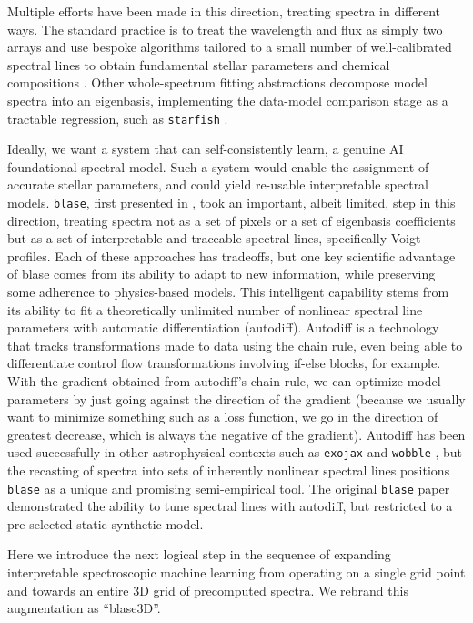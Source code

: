 \documentclass[twocolumn, linenumbers]{aastex631}
\begin{document}
Multiple efforts have been made in this direction, treating spectra in different ways. 
The standard practice is to treat the wavelength and flux as simply two arrays and use bespoke algorithms tailored to a small number of well-calibrated spectral lines to obtain fundamental stellar parameters and chemical compositions \citep{pipeline1, pipeline2}. 
Other whole-spectrum fitting abstractions decompose model spectra into an eigenbasis, implementing the data-model comparison stage as a tractable regression, such as \texttt{starfish} \citep{starfish}. 

Ideally, we want a system that can self-consistently learn, a genuine AI foundational spectral model. 
Such a system would enable the assignment of accurate stellar parameters, and could yield re-usable interpretable spectral models.
\texttt{blase}, first presented in \citealt{blase}, took an important, albeit limited, step in this direction, treating spectra not as a set of pixels or a set of eigenbasis coefficients but as a set of interpretable and traceable spectral lines, specifically Voigt profiles.
Each of these approaches has tradeoffs, but one key scientific advantage of blase comes from its ability to adapt to new information, while preserving some adherence to physics-based models. 
This intelligent capability stems from its ability to fit a theoretically unlimited number of nonlinear spectral line parameters with automatic differentiation (autodiff).
Autodiff is a technology that tracks transformations made to data using the chain rule, even being able to differentiate control flow transformations involving if-else blocks, for example.
With the gradient obtained from autodiff's chain rule, we can optimize model parameters by just going against the direction of the gradient (because we usually want to minimize something such as a loss function, we go in the direction of greatest decrease, which is always the negative of the gradient).
Autodiff has been used successfully in other astrophysical contexts such as \texttt{exojax} and \texttt{wobble} \citep{exojax, wobble}, but the recasting of spectra into sets of inherently nonlinear spectral lines positions \texttt{blase} as a unique and promising semi-empirical tool.
The original \texttt{blase} paper demonstrated the ability to tune spectral lines with autodiff, but restricted to a pre-selected static synthetic model. 

Here we introduce the next logical step in the sequence of expanding interpretable spectroscopic machine learning from operating on a single grid point and towards an entire 3D grid of precomputed spectra. 
We rebrand this augmentation as ``blase3D''.
\end{document}
